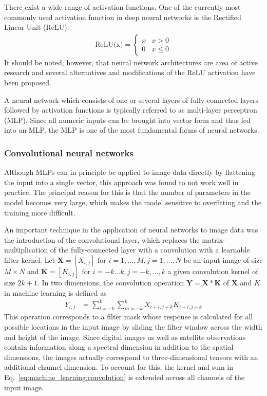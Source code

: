   There exist a wide range of activation functions. One of the currently most
  commonly used activation function in deep neural networks is the Rectified
  Linear Unit (ReLU).
  \begin{align}
    \text{ReLU(x)} = \begin{cases}
      x & x > 0 \\
      0 & x \leq 0
    \end{cases}
  \end{align}
  It should be noted, however, that neural network architectures are area of
  active research and several alternatives and modifications of the ReLU
  activation have been proposed.

  A neural network which consists of one or several layers of fully-connected
  layers followed by activation functions is typically referred to as
  multi-layer perceptron (MLP). Since all numeric inputs can be brought into
  vector form and thus fed into an MLP, the MLP is one of the most fundamental
  forms of neural networks.

\subsubsection{Convolutional neural networks}

Although MLPs can in principle be applied to image data directly by flattening
the input into a single vector, this approach was found to not work well in
practice. The principal reason for this is that the number of parameters in the
model becomes very large, which makes the model sensitive to overfitting and the
training more difficult.

An important technique in the application of neural networks to image data was
the introduction of the convolutional layer, which replaces the
matrix-multiplication of the fully-connected layer with a convolution with a
learnable filter kernel. Let $\bm{X} = [X_{i, j}]$ for $i = 1, \dots, M, j = 1,
\ldots, N$ be an input image of size $M \times N$ and $\bm{K} = [K_{i, j}]$ for
$i = - k \ldots k, j = -k, \ldots, k$ a given convolution kernel of size $2k +
1$. In two dimensions, the convolution operation $\bm{Y} = \bm{X} * \bm{K}$ of
$\bm{X}$ and $K$ in machine learning is defined as
\begin{align}\label{eq:machine_learning:convolution}
  Y_{i, j} &= \sum_{l=-k}^{k} \sum_{m=-k}^{k} X_{i + l, j + k} K_{i + l, j + k}
\end{align}
This operation corresponds to a filter mask whose response is calculated for all
possible locations in the input image by sliding the filter window across the
width and height of the image. Since digital images as well as satellite
observations contain information along a spectral dimension in addition to the
spatial dimensions, the images actually correspond to three-dimensional tensors
with an additional channel dimension. To account for this, the kernel and
sum in Eq.~\ref{eq:machine_learning:convolution} is extended
across all channels of the input image.

